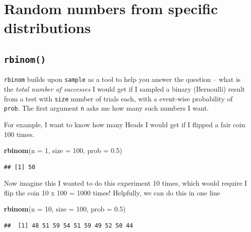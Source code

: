 \documentclass[
]{book}
\newenvironment{Shaded}{\begin{snugshade}}{\end{snugshade}}
\newcommand{\DataTypeTok}[1]{\textcolor[rgb]{0.13,0.29,0.53}{#1}}
\newcommand{\DecValTok}[1]{\textcolor[rgb]{0.00,0.00,0.81}{#1}}
\newcommand{\FloatTok}[1]{\textcolor[rgb]{0.00,0.00,0.81}{#1}}
\newcommand{\KeywordTok}[1]{\textcolor[rgb]{0.13,0.29,0.53}{\textbf{#1}}}
\newcommand{\NormalTok}[1]{#1}
\theoremstyle{definition}
\theoremstyle{definition}
\theoremstyle{definition}
\theoremstyle{remark}
\begin{document}
\hypertarget{random-numbers-from-specific-distributions}{%
\section{Random numbers from specific distributions}\label{random-numbers-from-specific-distributions}}

\hypertarget{rbinom}{%
\subsection*{\texorpdfstring{\texttt{rbinom()}}{rbinom()}}\label{rbinom}}

\texttt{rbinom} builds upon \texttt{sample} as a tool to help you answer the question -- what is the \emph{total number of successes} I would get if I sampled a binary (Bernoulli) result from a test with \texttt{size} number of trials each, with a event-wise probability of \texttt{prob}. The first argument \texttt{n} asks me how many such numbers I want.

For example, I want to know how many Heads I would get if I flipped a fair coin 100 times.

\begin{Shaded}
\begin{Highlighting}[]
\KeywordTok{rbinom}\NormalTok{(}\DataTypeTok{n =} \DecValTok{1}\NormalTok{, }\DataTypeTok{size =} \DecValTok{100}\NormalTok{, }\DataTypeTok{prob =} \FloatTok{0.5}\NormalTok{)}
\end{Highlighting}
\end{Shaded}

\begin{verbatim}
## [1] 50
\end{verbatim}

Now imagine this I wanted to do this experiment 10 times, which would require I flip the coin 10 x 100 = 1000 times! Helpfully, we can do this in one line

\begin{Shaded}
\begin{Highlighting}[]
\KeywordTok{rbinom}\NormalTok{(}\DataTypeTok{n =} \DecValTok{10}\NormalTok{, }\DataTypeTok{size =} \DecValTok{100}\NormalTok{, }\DataTypeTok{prob =} \FloatTok{0.5}\NormalTok{)}
\end{Highlighting}
\end{Shaded}

\begin{verbatim}
##  [1] 48 51 59 54 51 59 49 52 50 44
\end{verbatim}
\end{document}
